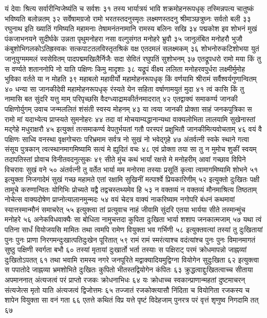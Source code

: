 यं देवाः श्रित्य सर्वारीन्विजेष्यंति च सर्वशः ३१
तस्य भार्यात्रयं भावि शक्रमोहनरूपधृक्
तस्मिन्नपत्य चातुष्कं भविष्यति बलोन्नतम् ३२
सर्वेषामग्रजो रामो भरतस्तदनुस्मृतः
लक्ष्मणस्तदनु श्रीमाञ्छत्रुघ्नः सर्वतो बली ३३
रघुनाथ इति ख्यातिं गमिष्यति महामनाः
तेषामनंतनामानि रामस्य बलिनः सखि ३४
पद्मकोश इव शोभनं मुखं
पंकजाभनयने सुदीर्घके
उन्नता पृथुमनोहरा नसा
वल्गुसंगत मनोहरे भ्रुवौ ३५
जानुलंबित मनोहरौ भुजौ
कंबुशोभिगलकोऽतिह्रस्वकः
सत्कपाटतलविस्तृतश्रिकं
वक्ष एतदमलं सलक्ष्मकम् ३६
शोभनोरुकटिशोभया युतं
जानुयुग्मममलं स्वसेवितम्
पादपद्ममखिलैर्निजैः सदा
सेवितं रघुपतिं सुशोभनम् ३७
एतद्रूपधरो रामो मया किं तु स वर्ण्यते
शताननोपि नो याति पक्षिणः किमु मादृशाः ३८
यद्रूपं वीक्ष्य ललिता मनोहरवपुर्धरा
लक्ष्मीर्मुमोह भुविका वर्तते या न मोहति ३९
महाबलो महावीर्यो महामोहनरूपधृक्
किं वर्णयामि श्रीरामं सर्वैश्वर्यगुणान्वितम् ४०
धन्या सा जानकीदेवी महामोहनरूपधृक्
रंस्यते येन सहिता वर्षाणामयुतं मुदा ४१
त्वं कासि किं तु नामासि बत सुंदरि यत्तु माम्
परिपृच्छसि वैदग्ध्याद्रामकीर्तनमादरात् ४२
एतद्वाक्यं समाकर्ण्य जानकी पक्षिणोर्युगम्
उवाच जन्मललितं शंसंती स्वस्य मोहनम् ४३
या त्वया जानकी प्रोक्ता साहं जनकपुत्रिका
स रामो मां यदाभ्येत्य प्राप्स्यते सुमनोहरः ४४
तदा वां मोचयाम्यद्धानान्यथा वाक्यलोभिता
लालयामि सुखेनास्तां मद्गेहे मधुराक्षरौ ४५
इत्युक्तं तत्समाकर्ण्य वेपतुर्भयतां गतौ
परस्परं प्रक्षुभितौ जानकीमित्यवोचताम् ४६
वयं वै पक्षिणः साध्वि वनस्था वृक्षगोचराः
परिभ्रमाम सर्वत्र नो सुखं नो भवेद्गृहे ४७
अंतर्वत्नी स्वके स्थाने गत्वा संसूय पुत्रकान्
त्वत्स्थानमागमिष्यामि सत्यं मे ह्युदितं वचः ४८
एवं प्रोक्ता तया सा तु न मुमोच शुकीं स्वयम्
तदापतिस्तां प्रोवाच विनीतवदनुत्सुकः ४९
सीते मुंच कथं भार्यां रक्षसे मे मनोहरीम्
आवां गच्छाव विपिने विचरावः सुखं वने ५०
अंतर्वत्नी तु वर्तेत भार्या मम मनोरमा
तस्याः प्रसूतिं कृत्वा त्वामागमिष्यामि शोभने ५१
इत्युक्ता निजगादेमं सुखं गच्छ महामते
एतां रक्षामि सुखिनीं मत्पार्श्वे प्रियकारिणीम् ५२
इत्युक्तो दुःखितः पक्षी तामूचे करुणान्वितः
योगिभिः प्रोच्यते यद्वै तद्वचस्तथ्यमेव हि ५३
न वक्तव्यं न वक्तव्यं मौनमाश्रित्य तिष्ठताम्
नोचेत्स वाक्यदोषेण प्राप्नोत्यालानमुन्मदः ५४
वयं चेदत्र वाक्यं नाकरिष्याम नगोपरि
बंधनं कथमावां स्यात्तस्मान्मौनं समाचरेत् ५५
इत्युक्त्वा तां प्रत्युवाच नाहं जीवामि सुंदरि
एतया भार्यया सीते तस्मान्मुंच मनोहरे ५६
अनेकविधवाक्यैः सा बोधिता नामुचत्तदा
कुपिता दुःखिता भार्या शशाप जनकात्मजाम् ५७
यथा त्वं पतिना सार्धं वियोजयसि मामितः
तथा त्वमपि रामेण वियुक्ता भव गर्भिणी ५८
इत्युक्तवत्यां तस्यां तु दुःखितायां पुनः पुनः
प्राणा निरगमन्दुःखात्पतिदुःखेन पूरितात् ५९
रामं रामं स्मरंत्याश्च वदंत्यांश्च पुनः पुनः
विमानमागतं सुष्ठु पक्षिणी स्वर्गता बभौ ६०
तस्यां मृतायां दुःखार्तो भर्ता तस्याः स पक्षिराट्
परमं क्रोधमापन्नो जाह्नव्यां दुःखितोऽपतत् ६१
तथा भवामि रामस्य नगरे जनपूरिते
मद्वाक्यादियमुद्विग्ना वियोगेन सुदुःखिता ६२
इत्युक्त्वा स पपातोदे जाह्नव्या भ्रमशोभिते
दुःखितः कुपितो भीतस्तद्वियोगेन कंपितः ६३
क्रुद्धत्वाद्दुःखितत्वाच्च सीताया अपमाननात्
अंत्यजत्वं परं प्राप्तो रजकः क्रोधनाभिधः ६४
यः क्रोधाच्च स्वकान्प्राणान्महतां दुष्टमाचरन्
संत्यजेत्स मृतो याति अंत्यजत्वं द्विजोत्तमः ६५
तज्जातं रजकोक्त्यासौ निंदिता च वियोगिता
रजकस्य च शापेन वियुक्ता सा वनं गता ६६
एतत्ते कथितं विप्र यत्ते पृष्टं विदेहजाम्
पुनरत्र परं वृत्तं शृणुष्व निगदामि तत् ६७

